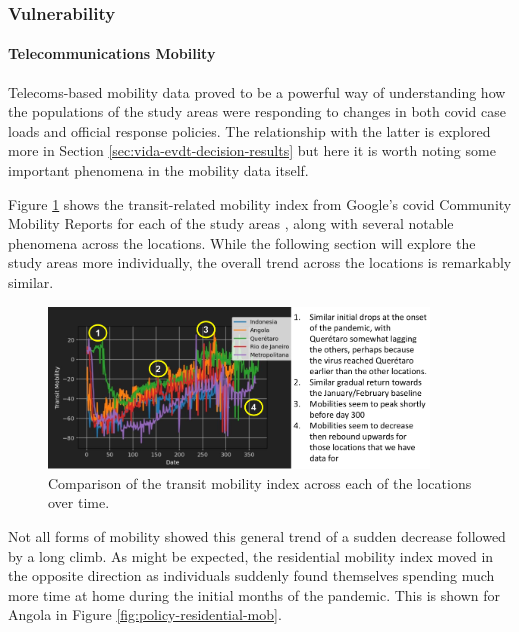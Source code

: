 \subsubsection{Vulnerability} \label{sec:vida-evdt-v-result}

\paragraph{Telecommunications Mobility} \leavevmode\newline

Telecoms-based mobility data proved to be a powerful way of understanding how the populations of the study areas were responding to changes in both \ac{covid} case loads and official response policies. The relationship with the latter is explored more in Section \ref{sec:vida-evdt-decision-results} but here it is worth noting some important phenomena in the mobility data itself.

Figure \ref{fig:transit-mobility-comparison} shows the transit-related mobility index from Google's \ac{covid} Community Mobility Reports for each of the study areas \cite{googleCOVID19CommunityMobility}, along with several notable phenomena across the locations. While the following section will explore the study areas more individually, the overall trend across the locations is remarkably similar. 

\begin{figure}[!htb]
\centering
\includegraphics[width=0.9\textwidth]{Figures/chap5/transit-mobility-comparison.png}
\caption[Transit Mobility Over Time for All Locations]{Comparison of the transit mobility index across each of the locations over time.}
\label{fig:transit-mobility-comparison}
\end{figure}

Not all forms of mobility showed this general trend of a sudden decrease followed by a long climb. As might be expected, the residential mobility index moved in the opposite direction as individuals suddenly found themselves spending much more time at home during the initial months of the pandemic. This is shown for Angola in Figure \ref{fig:policy-residential-mob}.

